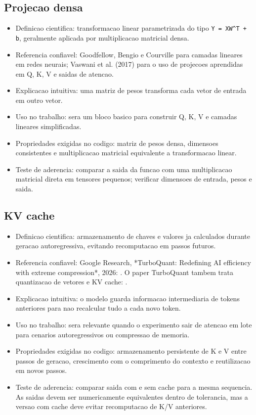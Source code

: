 \subsection{Projecao densa}


\begin{itemize}
\item Definicao cientifica: transformacao linear parametrizada do tipo
\texttt{Y = XW\textasciicircum{}T + b}, geralmente aplicada por multiplicacao matricial densa.
\item Referencia confiavel: Goodfellow, Bengio e Courville para camadas lineares em
redes neurais; Vaswani et al. (2017) para o uso de projecoes aprendidas em Q,
K, V e saidas de atencao.
\item Explicacao intuitiva: uma matriz de pesos transforma cada vetor de entrada em
outro vetor.
\item Uso no trabalho: sera um bloco basico para construir Q, K, V e camadas
lineares simplificadas.
\item Propriedades exigidas no codigo: matriz de pesos densa, dimensoes
consistentes e multiplicacao matricial equivalente a transformacao linear.
\item Teste de aderencia: comparar a saida da funcao com uma multiplicacao
matricial direta em tensores pequenos; verificar dimensoes de entrada, pesos e
saida.
\end{itemize}


\subsection{KV cache}


\begin{itemize}
\item Definicao cientifica: armazenamento de chaves e valores ja calculados durante
geracao autoregressiva, evitando recomputacao em passos futuros.
\item Referencia confiavel: Google Research, *TurboQuant: Redefining AI efficiency
with extreme compression*, 2026:
.
O paper TurboQuant tambem trata quantizacao de vetores e KV cache:
.
\item Explicacao intuitiva: o modelo guarda informacao intermediaria de tokens
anteriores para nao recalcular tudo a cada novo token.
\item Uso no trabalho: sera relevante quando o experimento sair de atencao em lote
para cenarios autoregressivos ou compressao de memoria.
\item Propriedades exigidas no codigo: armazenamento persistente de K e V entre
passos de geracao, crescimento com o comprimento do contexto e reutilizacao em
novos passos.
\item Teste de aderencia: comparar saida com e sem cache para a mesma sequencia. As
saidas devem ser numericamente equivalentes dentro de tolerancia, mas a versao
com cache deve evitar recomputacao de K/V anteriores.
\end{itemize}


